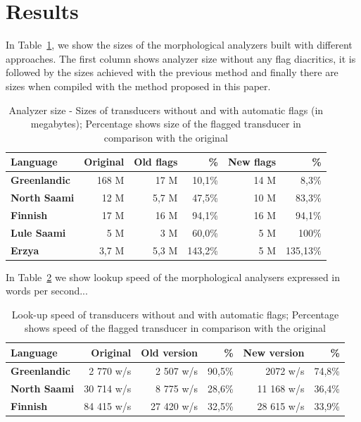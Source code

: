 \documentclass[11pt]{article}
\begin{document}
\section{Results}
In Table~\ref{table:sizes}, we show the sizes of the morphological analyzers built with different approaches. The first column shows analyzer 
size without any flag diacritics, it is followed by the sizes achieved with the previous method and finally there are sizes when 
compiled with the method proposed in this paper.
\begin{table}
    \centering
    \begin{tabular}{|l|r|r|r|r|r|}
        \hline
        \bf Language & \bf Original & \bf Old flags  & \bf \% & \bf New flags  & \bf \% \\
        \hline\hline
        \bf Greenlandic &   168 M  & 17 M & 10,1\% &  14 M & 8,3\% \\
        \bf North Saami &   12 M    & 5,7 M & 47,5\% & 10 M & 83,3\% \\
        \bf Finnish &   17 M    & 16 M & 94,1\% & 16 M & 94,1\% \\
        \bf Lule Saami  &   5 M    & 3 M & 60,0\% & 5 M & 100\% \\
        \bf Erzya       &   3,7 M    & 5,3 M & 143,2\% &  5 M & 135,13\% \\
        \hline
    \end{tabular}
    \caption{Analyzer size - Sizes of transducers without and with automatic flags (in megabytes); Percentage shows size of the flagged transducer in comparison with the original
    \label{table:sizes}}
\end{table}

In Table~\ref{table:lookup} we show lookup speed of the morphological analysers expressed in words per second...

\begin{table}[h]
 \centering
    \begin{tabular}{|l|r|r|r|r|r|}
        \hline
        \bf Language & \bf Original & \bf Old version & \bf \% & \bf New version & \bf \% \\
        \hline\hline
        \bf Greenlandic & 2 770 w/s & 2 507 w/s & 90,5\% & 2072 w/s & 74,8\%  \\
        \bf North Saami & 30 714 w/s & 8 775 w/s & 28,6\% & 11 168 w/s & 36,4\%  \\
        \bf Finnish  & 84 415 w/s & 27 420 w/s & 32,5\%  & 28 615 w/s & 33,9\%  \\
        \hline
    \end{tabular}
    \caption{Look-up speed of transducers without and with automatic flags; Percentage shows speed of the flagged transducer in comparison with the original
    \label{table:lookup}}
\end{table}
\end{document}
